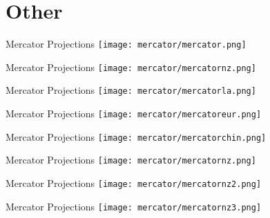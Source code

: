 \documentclass{beamer}
\theoremstyle{definition}
\begin{document}
\section{Other}
\begin{frame}{Mercator Projections}
\texttt{[image: mercator/mercator.png]}
\end{frame}
\begin{frame}{Mercator Projections}
\texttt{[image: mercator/mercatornz.png]}
\end{frame}
\begin{frame}{Mercator Projections}
\texttt{[image: mercator/mercatorla.png]}
\end{frame}
\begin{frame}{Mercator Projections}
\texttt{[image: mercator/mercatoreur.png]}
\end{frame}
\begin{frame}{Mercator Projections}
\texttt{[image: mercator/mercatorchin.png]}
\end{frame}
\begin{frame}{Mercator Projections}
\texttt{[image: mercator/mercatornz.png]}
\end{frame}
\begin{frame}{Mercator Projections}
\texttt{[image: mercator/mercatornz2.png]}
\end{frame}
\begin{frame}{Mercator Projections}
\texttt{[image: mercator/mercatornz3.png]}
\end{frame}
\fi
\end{document}
